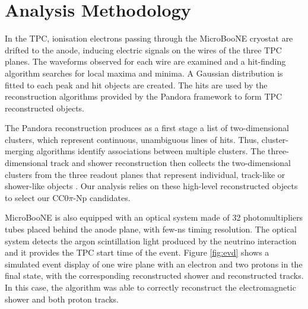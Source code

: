 
\section{Analysis Methodology}
\label{sec:methodology}


In the TPC, ionisation electrons passing through the MicroBooNE cryostat are drifted to the anode, inducing electric signals on the wires of the three TPC planes. The waveforms observed for each wire are examined and a hit-finding algorithm searches for local maxima and minima. A Gaussian distribution is fitted to each peak and hit objects are created. The hits are used by the reconstruction algorithms provided by the Pandora framework \cite{pandora} to form TPC reconstructed objects. 

The Pandora reconstruction produces as a first stage a list of two-dimensional clusters, which represent continuous, unambiguous lines of hits. Thus, cluster-merging algorithms identify associations between multiple clusters. The three-dimensional track and shower reconstruction then collects the two-dimensional clusters from the three readout planes that represent individual, track-like or shower-like objects \cite{pandora2}. Our analysis relies on these high-level reconstructed objects to select our CC0$\pi$-Np candidates.

MicroBooNE is also equipped with an optical system made of 32 photomultipliers tubes placed behind the anode plane, with few-ns timing resolution. The optical system detects the argon scintillation light produced by the neutrino interaction and it provides the TPC start time of the event.
Figure \ref{fig:evd} shows a simulated event display of one wire plane with an electron and two protons in the final state, with the corresponding reconstructed shower and reconstructed tracks. In this case, the algorithm was able to correctly reconstruct the electromagnetic shower and both proton tracks.

